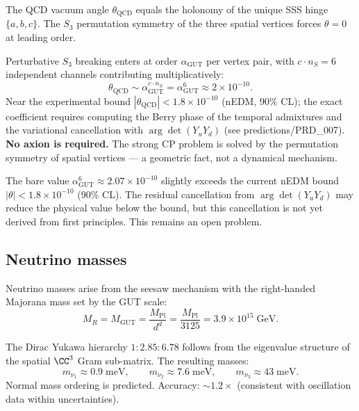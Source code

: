 The QCD vacuum angle $\theta_\text{QCD}$ equals the holonomy of the unique SSS hinge $\{a, b, c\}$. The $S_3$ permutation symmetry of the three spatial vertices forces $\theta = 0$ at leading order.

Perturbative $S_3$ breaking enters at order $\alpha_\text{GUT}$ per vertex pair, with $c \cdot n_S = 6$ independent channels contributing multiplicatively:
\begin{equation}
\theta_\text{QCD} \sim \alpha_\text{GUT}^{c \cdot n_S} = \alpha_\text{GUT}^6 \approx 2 \times 10^{-10}.
\end{equation}
Near the experimental bound $|\theta_\text{QCD}| < 1.8 \times 10^{-10}$ (nEDM, 90\% CL); the exact coefficient requires computing the Berry phase of the temporal admixtures and the variational cancellation with $\arg\det(Y_u Y_d)$ (see predictions/PRD\_007).  \textbf{No axion is required.} The strong CP problem is solved by the permutation symmetry of spatial vertices --- a geometric fact, not a dynamical mechanism.

\begin{remark}
The bare value $\alpha_\text{GUT}^6 \approx 2.07 \times 10^{-10}$ slightly exceeds the current nEDM bound $|\theta| < 1.8 \times 10^{-10}$ (90\% CL). The residual cancellation from $\arg\det(Y_u Y_d)$ may reduce the physical value below the bound, but this cancellation is not yet derived from first principles. This remains an open problem.
\end{remark}

\subsection{Neutrino masses}

Neutrino masses arise from the seesaw mechanism with the right-handed Majorana mass set by the GUT scale:
\begin{equation}
M_R = M_\text{GUT} = \frac{M_\text{Pl}}{d^d} = \frac{M_\text{Pl}}{3125} = 3.9 \times 10^{15}\;\text{GeV}.
\end{equation}

The Dirac Yukawa hierarchy $1 : 2.85 : 6.78$ follows from the eigenvalue structure of the spatial $\CC^3$ Gram sub-matrix. The resulting masses:
\begin{equation}
m_{\nu_1} \approx 0.9\;\text{meV}, \qquad m_{\nu_2} \approx 7.6\;\text{meV}, \qquad m_{\nu_3} \approx 43\;\text{meV}.
\end{equation}
Normal mass ordering is predicted. Accuracy: $\sim 1.2\times$ (consistent with oscillation data within uncertainties).

